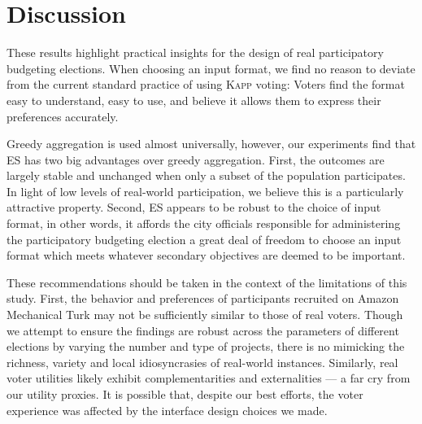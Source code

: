 \documentclass[twoside,11pt]{article}
\newcommand{\kibitz}[2]{\ifnum\Comments=1{\color{#1}{#2}}\fi}
\newcommand{\gb}[1]{\kibitz{red}{[GB:#1]}}
\newcommand{\knap}{\textsc{Knap}}
\newcommand{\kapp}{\textsc{Kapp}}
\newcommand{\mes}{ES}
\begin{document}
\section{Discussion} 
These results highlight practical insights  for the design of real participatory budgeting elections. 
When choosing an input format, we find no reason to deviate from the current standard practice of  using \kapp{} voting: Voters find the format easy to understand, easy to  use, and believe it allows them to express their preferences accurately. 

Greedy aggregation is used almost universally,  however, our experiments find that \mes{} has  two  big advantages over greedy aggregation.  First,  the outcomes are largely stable and unchanged when only a subset of the population participates. In light of low levels of real-world participation, we believe this is a particularly attractive property. Second, \mes{} appears to be robust to the choice of input format, in other words, it affords the city officials responsible for administering the participatory budgeting election a great deal of freedom to choose an input format which meets whatever secondary objectives are deemed to be important. %




These recommendations should be taken in the context of the limitations of this study. First, the  behavior and preferences of participants recruited on Amazon Mechanical Turk may not be sufficiently similar to those of real voters.  Though we attempt to  ensure the findings are robust across the parameters of different elections by varying the number and type of projects, there is no mimicking the richness, variety and local idiosyncrasies of real-world instances. Similarly, real voter utilities likely exhibit complementarities and externalities  --- a far cry from our utility proxies. It is possible that, despite our best efforts, the   voter experience   was affected by the interface design choices we made. 
\end{document}
